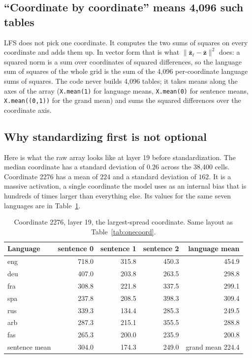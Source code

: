 \subsection{``Coordinate by coordinate'' means 4,096 such tables}

LFS does not pick one coordinate. It computes the two sums of squares on
every coordinate and adds them up. In vector form that is what
$\|\bar{\mathbf z}_\ell - \bar{\mathbf z}\|^2$ does: a squared norm is a sum
over coordinates of squared differences, so the language sum of squares of
the whole grid is the sum of the 4,096 per-coordinate language sums of
squares. The code never builds 4,096 tables; it takes means along the axes of
the array (\texttt{X.mean(1)} for language means, \texttt{X.mean(0)} for
sentence means, \texttt{X.mean((0,1))} for the grand mean) and sums the
squared differences over the coordinate axis.

\subsection{Why standardizing first is not optional}

Here is what the raw array looks like at layer 19 before standardization.
The median coordinate has a standard deviation of $0.26$ across the 38,400
cells. Coordinate 2276 has a mean of $224$ and a standard deviation of
$162$. It is a massive activation, a single coordinate the model uses as an
internal bias that is hundreds of times larger than everything else. Its
values for the same seven languages are in Table~\ref{tab:massive}.

\begin{table}[h]\centering\small
\caption{Coordinate 2276, layer 19, the largest-spread coordinate. Same layout as Table~\ref{tab:onecoord}.}
\label{tab:massive}
\begin{tabular}{lrrrr}
\toprule
Language & sentence 0 & sentence 1 & sentence 2 & language mean \\
\midrule
eng & 718.0 & 315.8 & 450.3 & 454.9 \\
deu & 407.0 & 203.8 & 263.5 & 298.8 \\
fra & 308.8 & 221.8 & 337.5 & 299.1 \\
spa & 237.8 & 208.5 & 398.3 & 309.4 \\
rus & 339.3 & 134.4 & 285.3 & 249.5 \\
arb & 287.3 & 215.1 & 355.5 & 288.8 \\
fas & 265.3 & 200.0 & 235.9 & 200.8 \\
\midrule
sentence mean & 304.0 & 174.3 & 249.0 & grand mean 224.4 \\
\bottomrule
\end{tabular}
\end{table}

